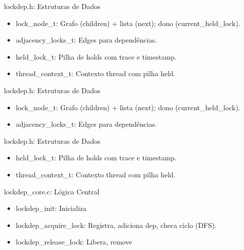\documentclass{beamer}
\newcommand{\cHeader}{../../src/include/lockdep.h}
\begin{document}
\begin{frame}{lockdep.h: Estruturas de Dados}
  \begin{itemize}
    \item lock_node_t: Grafo (children) + lista (next); dono (current_held_lock).
    \item adjacency_locks_t: Edges para dependências.
    \item held_lock_t: Pilha de holds com trace e timestamp.
    \item thread_context_t: Contexto thread com pilha held.
  \end{itemize}
\end{frame}

\begin{frame}{lockdep.h: Estruturas de Dados}
    \begin{itemize}
        \item lock_node_t: Grafo (children) + lista (next); dono (current_held_lock).
    \end{itemize}
    
    \begin{itemize}
        \item adjacency_locks_t: Edges para dependências.
    \end{itemize}
    
\end{frame}

\begin{frame}{lockdep.h: Estruturas de Dados}
  \begin{itemize}
    \item held_lock_t: Pilha de holds com trace e timestamp.
  \end{itemize}
  
  \begin{itemize}
    \item thread_context_t: Contexto thread com pilha held.
  \end{itemize}
  
\end{frame}

\begin{frame}{lockdep_core.c: Lógica Central}
  \begin{itemize}
    \item lockdep_init: Inicializa
    \item lockdep_acquire_lock: Registra, adiciona dep, checa ciclo (DFS).
    \item lockdep_release_lock: Libera, remove
  \end{itemize}
\end{frame}
\end{document}
